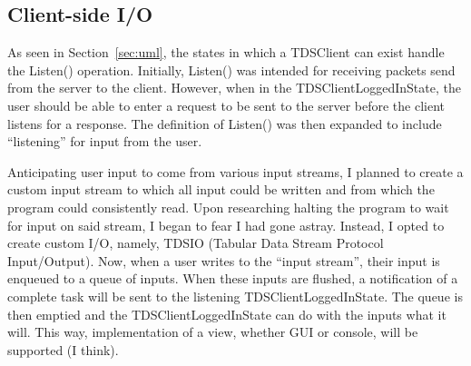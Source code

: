 \documentclass{article}
\begin{document}
    \subsection{Client-side I/O}\label{sec:dec:clientio}
        As seen in Section~\ref{sec:uml}, the states in which a TDSClient can exist handle the Listen() operation. Initially, Listen() was intended for receiving packets send from the server to the client. However, when in the TDSClientLoggedInState, the user should be able to enter a request to be sent to the server before the client listens for a response. The definition of Listen() was then expanded to include ``listening'' for input from the user.

        Anticipating user input to come from various input streams, I planned to create a custom input stream to which all input could be written and from which the program could consistently read. Upon researching halting the program to wait for input on said stream, I began to fear I had gone astray. Instead, I opted to create custom I/O, namely, TDSIO (Tabular Data Stream Protocol Input/Output). Now, when a user writes to the ``input stream'', their input is enqueued to a queue of inputs. When these inputs are flushed, a notification of a complete task will be sent to the listening TDSClientLoggedInState. The queue is then emptied and the TDSClientLoggedInState can do with the inputs what it will. This way, implementation of a view, whether GUI or console, will be supported (I think).

\end{document}
